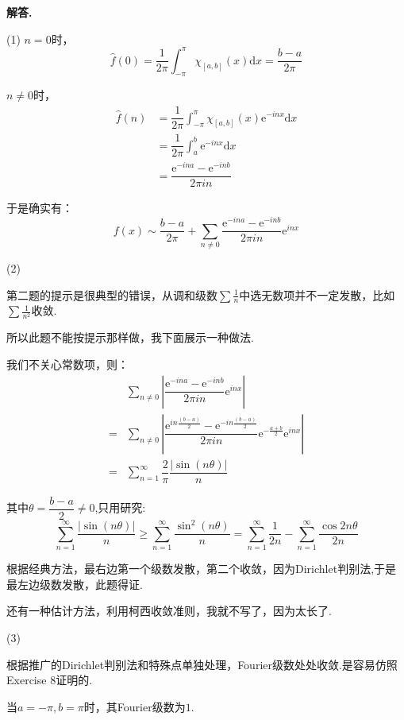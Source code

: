 \documentclass[12pt, a4paper, oneside]{ctexart}
\newenvironment{solution}{\par\noindent\textbf{解答. }}{\par}
\begin{document}
\begin{solution}
\par
(1)
$n=0$时，
$$
\hat{f}(0)=\dfrac{1}{2\pi}\int_{-\pi}^{\pi}\chi_{[a,b]}(x)\mathrm{d}x=\dfrac{b-a}{2\pi}
$$
\par
$n\neq 0$时，
$$
\begin{aligned}
\hat{f}(n)&=\dfrac{1}{2\pi}\int_{-\pi}^{\pi}\chi_{[a,b]}(x)\mathrm{e}^{-inx}\mathrm{d}x\\
&=\dfrac{1}{2\pi}\int_{a}^{b}\mathrm{e}^{-inx}\mathrm{d}x\\
&=\dfrac{\mathrm{e}^{-ina}-\mathrm{e}^{-inb}}{2\pi i n}
\end{aligned}
$$
\par
于是确实有：
$$
f(x)\sim \dfrac{b-a}{2\pi}+\sum_{n \neq 0}\dfrac{\mathrm{e}^{-ina}-\mathrm{e}^{-inb}}{2\pi i n}\mathrm{e}^{inx}
$$
\par
(2)
\par
第二题的提示是很典型的错误，从调和级数$\sum\frac{1}{n}$中选无数项并不一定发散，比如
$\sum \frac{1}{n^2}$收敛.
\par
所以此题不能按提示那样做，我下面展示一种做法.
\par
我们不关心常数项，则：
$$
\begin{aligned}
&\sum_{n\neq 0}\left|\dfrac{\mathrm{e}^{-ina}-\mathrm{e}^{-inb}}{2\pi in}\mathrm{e}^{inx}
\right|\\
=&\sum_{n\neq 0}\left|\dfrac{\mathrm{e}^{in\frac{(b-a)}{2}}
-\mathrm{e}^{-in\frac{(b-a)}{2}}}{2\pi in}\mathrm{e}^{-\frac{a+b}{2}}\mathrm{e}^{inx}\right|\\
=&\sum_{n=1}^{\infty}\dfrac{2}{\pi}\dfrac{|\sin (n\theta)|}{n}
\end{aligned}
$$
\par
其中$\theta=\dfrac{b-a}{2}\neq 0$,只用研究:
$$
\sum_{n=1}^{\infty}\dfrac{|\sin (n\theta)|}{n}\geqslant \sum_{n=1}^{\infty}\dfrac{\sin^2(n\theta)}{n}=
\sum_{n=1}^{\infty}\dfrac{1}{2n}-\sum_{n=1}^{\infty}\dfrac{\cos 2n\theta}{2n}
$$
\par
根据经典方法，最右边第一个级数发散，第二个收敛，因为Dirichlet判别法,于是最左边级数发散，此题得证.
\par
还有一种估计方法，利用柯西收敛准则，我就不写了，因为太长了.
\par
(3)
\par
根据推广的Dirichlet判别法和特殊点单独处理，Fourier级数处处收敛.是容易仿照Exercise 8证明的.
\par
当$a=-\pi,b=\pi$时，其Fourier级数为$1$.


\end{solution}
\end{document}

